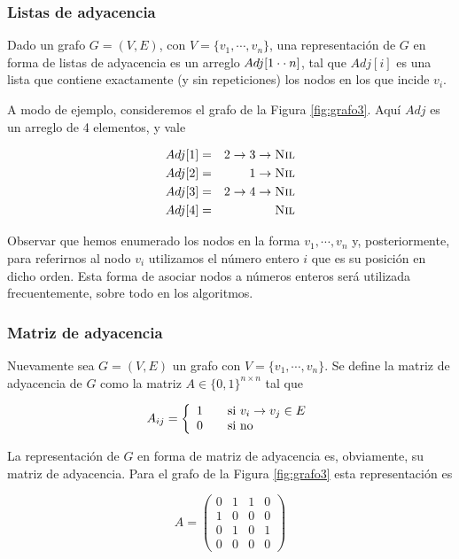 \subsubsection{Listas de adyacencia}
Dado un grafo $G = (V, E)$, con $V = \{v_1, \cdots, v_n\}$, una representación de $G$ en forma de listas de adyacencia es un arreglo $Adj[1 \cdot\cdot\hspace{0.75mm}  n]$, tal que $Adj[i]$ es una lista que contiene exactamente (y sin repeticiones) los nodos en los que incide $v_i$.

A modo de ejemplo, consideremos el grafo de la Figura \ref{fig:grafo3}. Aquí $Adj$ es un arreglo de 4 elementos, y vale 
	
\begin{eqnarray*}
Adj[1] &=& 2 \to 3 \to \textsc{Nil}\\
Adj[2] &=& 1 \to \textsc{Nil}\\
Adj[3] &=& 2 \to 4 \to \textsc{Nil}\\
Adj[4] &=& \textsc{Nil}
\end{eqnarray*}

Observar que hemos enumerado los nodos en la forma $v_1, \cdots, v_n$ y, posteriormente, para referirnos al nodo $v_i$ utilizamos el número entero $i$ que es su posición en dicho orden. Esta forma de asociar nodos a números enteros será utilizada frecuentemente, sobre todo en los algoritmos.

\subsubsection{Matriz de adyacencia}
Nuevamente sea $G = (V, E)$ un grafo con $V = \{v_1, \cdots, v_n\}$. Se define la matriz de adyacencia de $G$ como la matriz $A \in \{0, 1\}^{n \times n}$ tal que

\[A_{ij} = \left\{ 
  \begin{array}{l l}
    1 & \quad \text{si } v_i \to v_j \in E\\
    0 & \quad \text{si no}
  \end{array} \right.
\]

La representación de $G$ en forma de matriz de adyacencia es, obviamente, su matriz de adyacencia. Para el grafo de la Figura \ref{fig:grafo3} esta representación es

\[A = \begin{pmatrix}
0 & 1 & 1 & 0\\
1 & 0 & 0 & 0\\
0 & 1 & 0 & 1\\
0 & 0 & 0 & 0
\end{pmatrix}\]

